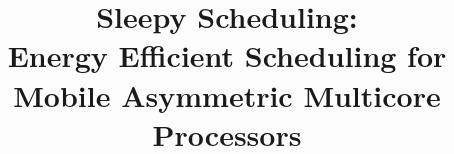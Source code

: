 \documentclass[conference]{IEEEtran}
\begin{document}
\title{Sleepy Scheduling: \\ Energy Efficient Scheduling for Mobile Asymmetric Multicore Processors}



\maketitle
\end{document}
